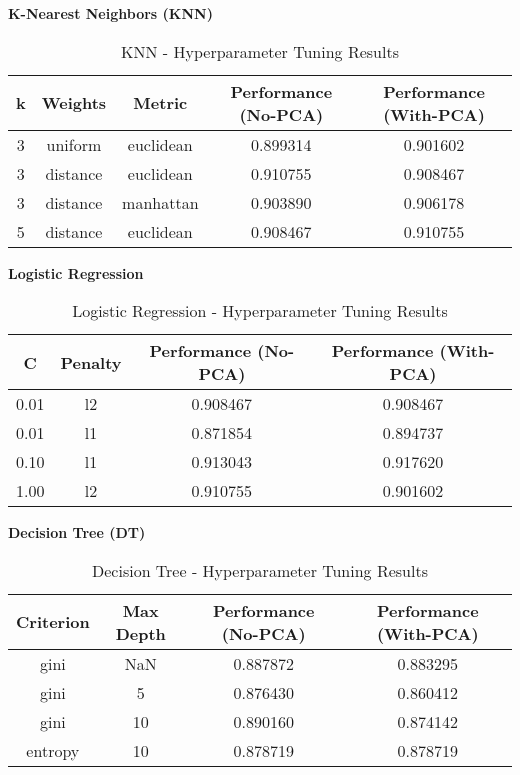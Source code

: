 \documentclass[11pt]{article}
\begin{document}
\vspace{0.6cm}
\textbf{K-Nearest Neighbors (KNN)}
\begin{table}[H]
\centering
\caption{KNN - Hyperparameter Tuning Results}
\begin{tabular}{|c|c|c|c|c|} 
\hline
\textbf{k} & \textbf{Weights} & \textbf{Metric} & \textbf{Performance (No-PCA)} & \textbf{Performance (With-PCA)} \\
\hline
3 & uniform  & euclidean & 0.899314 & 0.901602 \\
3 & distance & euclidean & 0.910755 & 0.908467 \\
3 & distance & manhattan & 0.903890 & 0.906178 \\
5 & distance & euclidean & 0.908467 & 0.910755 \\
\hline
\end{tabular}
\end{table}

\vspace{0.6cm}
\textbf{Logistic Regression}
\begin{table}[H]
\centering
\caption{Logistic Regression - Hyperparameter Tuning Results}
\begin{tabular}{|c|c|c|c|} 
\hline
\textbf{C} & \textbf{Penalty} & \textbf{Performance (No-PCA)} & \textbf{Performance (With-PCA)} \\
\hline
0.01 & l2 & 0.908467 & 0.908467 \\
0.01 & l1 & 0.871854 & 0.894737 \\
0.10 & l1 & 0.913043 & 0.917620 \\  
1.00 & l2 & 0.910755 & 0.901602 \\
\hline
\end{tabular}
\end{table}

\vspace{2.5cm}
\textbf{Decision Tree (DT)}
\begin{table}[H]
\centering
\caption{Decision Tree - Hyperparameter Tuning Results}
\begin{tabular}{|c|c|c|c|} 
\hline
\textbf{Criterion} & \textbf{Max Depth} & \textbf{Performance (No-PCA)} & \textbf{Performance (With-PCA)} \\
\hline
gini    & NaN  & 0.887872 & 0.883295 \\
gini    & 5    & 0.876430 & 0.860412 \\
gini    & 10   & 0.890160 & 0.874142 \\  %
entropy & 10   & 0.878719 & 0.878719 \\
\hline
\end{tabular}
\end{table}
\end{document}
